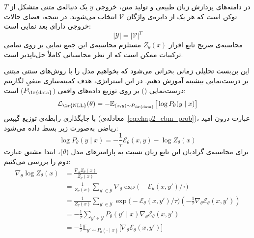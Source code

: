 در دامنه‌های پردازش زبان طبیعی و تولید متن، خروجی $y$ یک دنباله‌ی متنی متشکل از $T$ توکن است که هر یک از دایره‌ی واژگان $\mathcal{V}$ انتخاب می‌شوند. در نتیجه، فضای حالات خروجی دارای بعد نمایی است:
\begin{equation}\label{eq:chap2_state_space_cardinality}
    |\mathcal{Y}| = |\mathcal{V}|^T
\end{equation}
محاسبه‌ی صریح تابع افراز $Z_\theta(x)$ مستلزم محاسبه‌ی این جمع نمایی بر روی تمامی ترکیبات ممکن است که از نظر محاسباتی کاملاً حل‌ناپذیر است.

این بن‌بست تحلیلی زمانی بحرانی می‌شود که بخواهیم مدل را با روش‌های سنتی مبتنی بر درست‌نمایی بیشینه آموزش دهیم. در این استراتژی، هدف کمینه‌سازی منفیِ لگاریتم درست‌نمایی () بر روی توزیع داده‌های واقعی ($P_{\text{\lr{data}}}$) است:
\begin{equation}\label{eq:chap2_nll_loss}
    \mathcal{L}_{\text{\lr{NLL}}}(\theta) = -\mathbb{E}_{(x, y) \sim P_{\text{\lr{data}}}} \big[ \log P_\theta(y \mid x) \big]
\end{equation}
با جایگذاری رابطه‌ی توزیع گیبس (معادله‌ی~\ref{eq:chap2_ebm_prob})، عبارت درون امید ریاضی به‌صورت زیر بسط داده می‌شود:
\begin{equation}\label{eq:chap2_log_prob_expansion}
    \log P_\theta(y \mid x) = -\frac{1}{\tau} \mathcal{E}_\theta(x, y) - \log Z_\theta(x)
\end{equation}
برای محاسبه‌ی گرادیان این تابع زیان نسبت به پارامترهای مدل ($\theta$)، ابتدا مشتق عبارت دوم را بررسی می‌کنیم:
\begin{align}
    \nabla_\theta \log Z_\theta(x) &= \frac{\nabla_\theta Z_\theta(x)}{Z_\theta(x)} \nonumber \\
    &= \frac{1}{Z_\theta(x)} \sum_{y' \in \mathcal{Y}} \nabla_\theta \exp\big( -\mathcal{E}_\theta(x, y') / \tau \big) \nonumber \\
    &= \frac{1}{Z_\theta(x)} \sum_{y' \in \mathcal{Y}} \exp\big( -\mathcal{E}_\theta(x, y') / \tau \big) \left( -\frac{1}{\tau} \nabla_\theta \mathcal{E}_\theta(x, y') \right) \nonumber \\
    &= -\frac{1}{\tau} \sum_{y' \in \mathcal{Y}} P_\theta(y' \mid x) \nabla_\theta \mathcal{E}_\theta(x, y') \nonumber \\
    &= -\frac{1}{\tau} \mathbb{E}_{y' \sim P_\theta(\cdot \mid x)} \big[ \nabla_\theta \mathcal{E}_\theta(x, y') \big] \label{eq:chap2_grad_partition_derivation}
\end{align}

